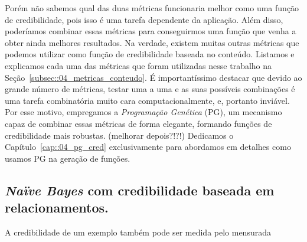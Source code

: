     Porém não sabemos qual das duas métricas funcionaria melhor como uma função de credibilidade, pois isso é uma tarefa dependente da aplicação. Além disso, poderíamos combinar essas métricas para conseguirmos uma função que venha a obter ainda melhores resultados. Na verdade, existem muitas outras métricas que podemos utilizar como função de credibilidade baseada no conteúdo. Listamos e explicamos cada uma das métricas que foram utilizadas nesse trabalho na Seção~\ref{subsec::04_metricas_conteudo}. É importantíssimo destacar que devido ao grande número de métricas, testar uma a uma e as suas possíveis combinações é uma tarefa combinatória muito cara computacionalmente, e, portanto inviável. Por esse motivo, empregamos a \textit{Programação Genética} (PG), um mecanismo capaz de combinar essas métricas de forma elegante, formando funções de credibilidade mais robustas. (melhorar depois?!?!) Dedicamos o Capítulo~\ref{cap::04_pg_cred} exclusivamente para abordamos em detalhes como usamos PG na geração de funções.

\subsection{\textit{Naïve Bayes} com credibilidade baseada em relacionamentos.}
\label{subsubsec::nbcredgrafos}

A credibilidade de um exemplo também pode ser medida pelo mensurada 
%




